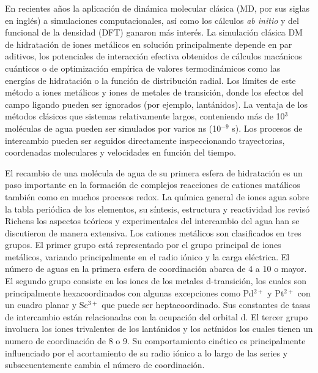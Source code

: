En recientes a\~nos la aplicaci\'on de din\'amica molecular cl\'asica
(MD, por sus siglas en ingl\'es) a simulaciones computacionales, 
as\'i como los c\'alculos {\it ab initio} y del funcional de la 
densidad (DFT) ganaron m\'as inter\'es. La simulaci\'on cl\'asica DM
de hidrataci\'on de iones met\'alicos en soluci\'on principalmente
depende en par aditivos, los potenciales de interacci\'on efectiva
obtenidos de c\'alculos mac\'anicos cu\'anticos o de optimizaci\'on
emp\'irica de valores termodin\'amicos como las energ\'ias de 
hidrataci\'on o la funci\'on de distribuci\'on radial. Los l\'imites
de este m\'etodo  a iones met\'alicos  y iones de metales de 
transici\'on, donde los efectos del campo ligando pueden ser 
ignorados (por ejemplo, lant\'anidos). La ventaja de los m\'etodos 
cl\'asicos que sistemas relativamente largos, conteniendo m\'as de
10$^3$ mol\'eculas de agua pueden ser simulados  por varios ns 
(10$^{-9}$ s). Los procesos de intercambio pueden ser seguidos 
directamente inspeccionando trayectorias, coordenadas moleculares y
velocidades en funci\'on del tiempo.

El recambio de una mol\'ecula de agua  de su primera esfera de 
hidrataci\'on es un paso importante en la formaci\'on de complejos
reacciones de cationes mat\'alicos tambi\'en como en muchos procesos
redox. La qu\'imica general de iones agua sobre la tabla peri\'odica
de los elementos, su s\'intesis, estructura y reactividad los 
revis\'o Richens los aspectos te\'oricos y experimentales del 
intercambio del agua han se discutieron de manera extensiva. Los
cationes met\'alicos son clasificados  en tres grupos. El primer
grupo est\'a representado por el grupo principal de iones 
met\'alicos, variando principalmente en el radio i\'onico y la carga
el\'ectrica. El n\'umero de aguas en la primera esfera de 
coordinaci\'on abarca de 4 a 10 o mayor. El segundo grupo consiste en
los iones de los metales d-transici\'on, los cuales son 
principalmente hexacoordinados con algunas excepciones como Pd$^{2+}$
y Pt$^{2+}$ con un cuadro planar y Sc$^{3+}$ que puede ser 
heptacoordinado. Sus constantes de tasas de intercambio est\'an 
relacionadas con la ocupaci\'on del orbital d. El tercer grupo
involucra los iones trivalentes de los lant\'anidos y los act\'inidos
los cuales tienen un numero de coordinaci\'on de 8 o 9. Su 
comportamiento cin\'etico es principalmente influenciado por el 
acortamiento de su radio i\'onico a lo largo de las series y 
subsecuentemente cambia el n\'umero de coordinaci\'on.
